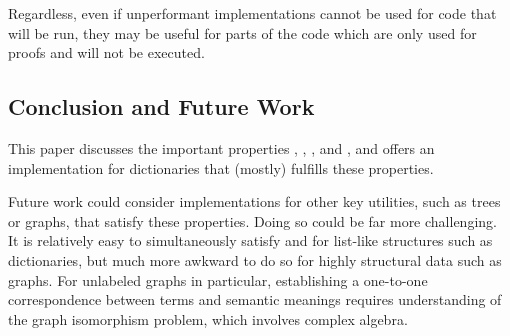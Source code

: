 Regardless, even if unperformant implementations
%
cannot be used for code that will be run, they may be useful for parts of the code which are only used for proofs and will not be executed.


\subsection{Conclusion and Future Work}
\label{sec:Discussion:Conclusion}
%
This paper discusses the important properties \SemTot, \SemInj, \EqDec, and \EzDstr, and offers an implementation for dictionaries that (mostly) fulfills these properties.

Future work could consider implementations for other key utilities, such as trees or graphs, that satisfy these properties.
%
Doing so could be far more challenging.
%
It is relatively easy to simultaneously satisfy \SemTot{} and \SemInj{} for list-like structures such as dictionaries,
%
but much more awkward to do so for highly structural data such as graphs. For unlabeled graphs in particular, establishing a one-to-one correspondence between terms and
%
semantic meanings requires understanding of the graph isomorphism problem, which involves complex algebra.

